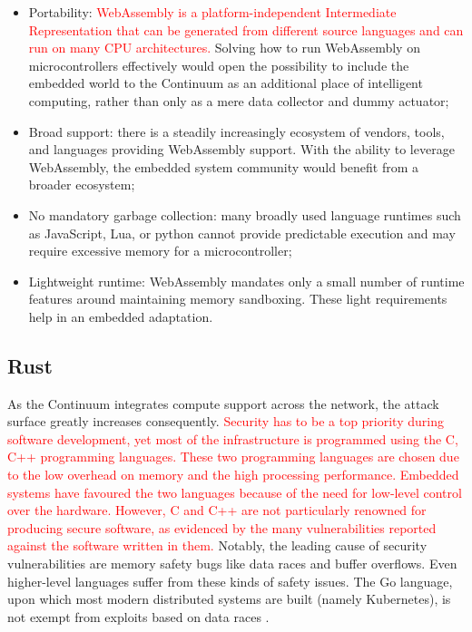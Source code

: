 \begin{itemize}
    \item Portability: \textcolor{red}{WebAssembly is a platform-independent Intermediate Representation that can be generated from different source languages and can run on many CPU architectures.} Solving how to run WebAssembly on microcontrollers effectively would open the possibility to include the embedded world to the Continuum as an additional place of intelligent computing, rather than only as a mere data collector and dummy actuator;
    \item Broad support: there is a steadily increasingly ecosystem of vendors, tools, and languages providing WebAssembly support. With the ability to leverage WebAssembly, the embedded system community would benefit from a broader ecosystem;
    \item No mandatory garbage collection: many broadly used language runtimes such as JavaScript, Lua, or python cannot provide predictable execution and may require excessive memory for a microcontroller;
    \item Lightweight runtime: WebAssembly mandates only a small number of runtime features around maintaining memory sandboxing. These light requirements help in an embedded adaptation.
\end{itemize}

\subsection{Rust}
\label{sec:rust}

As the Continuum integrates compute support across the network, the attack surface greatly increases consequently. \textcolor{red}{Security has to be a top priority during software development, yet most of the infrastructure is programmed using the C, C++ programming languages. These two programming languages are chosen due to the low overhead on memory and the high processing performance. Embedded systems have favoured the two languages because of the need for low-level control over the hardware. However, C and C++ are not particularly renowned for producing secure software, as evidenced by the many vulnerabilities reported against the software written in them.} Notably, the leading cause of security vulnerabilities are memory safety bugs like data races and buffer overflows. Even higher-level languages suffer from these kinds of safety issues. The Go language, upon which most modern distributed systems are built (namely Kubernetes), is not exempt from exploits based on data races \cite{go-data-races}.

